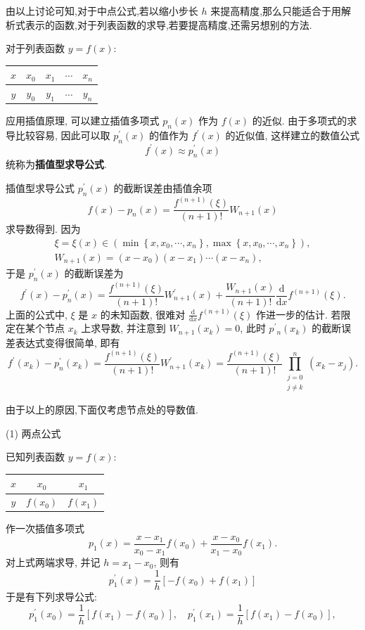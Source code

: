 由以上讨论可知,对于中点公式,若以缩小步长 $h$ 来提高精度,那么只能适合于用解析式表示的函数,对于列表函数的求导,若要提高精度,还需另想别的方法.

对于列表函数 $y=f(x)$:
\begin{center}
\begin{tabular}{c|cccc}
$ x $ & $ x_{0} $ & $ x_{1} $ & $ \cdots $ & $ x_{n} $ \\
\hline$ y $ & $ y_{0} $ & $ y_{1} $ & $ \cdots $ & $ y_{n} $
\end{tabular}
\end{center}
应用插值原理, 可以建立插值多项式 $ p_{n}(x) $ 作为 $ f(x) $ 的近似. 由于多项式的求导比较容易, 因此可以取 $ p_{n}^{\prime}(x) $ 的值作为 $ f^{\prime}(x) $ 的近似值, 这样建立的数值公式
$$
f^{\prime}(x) \approx p_{n}^{\prime}(x)
$$
统称为\textbf{插值型求导公式}.

插值型求导公式 $ p_{n}^{\prime}(x) $ 的截断误差由插值余项
$$
f(x)-p_{n}(x)=\frac{f^{(n+1)}(\xi)}{(n+1)!} W_{n+1}(x)
$$
求导数得到. 因为
$$
\begin{array}{c}
\xi=\xi(x) \in\left(\min \left\{x, x_{0}, \cdots, x_{n}\right\}, \max \left\{x, x_{0}, \cdots, x_{n}\right\}\right), \\
W_{n+1}(x)=\left(x-x_{0}\right)\left(x-x_{1}\right) \cdots\left(x-x_{n}\right),
\end{array}
$$
于是 $ p_{n}^{\prime}(x) $ 的截断误差为
$$
f^{\prime}(x)-p_{n}^{\prime}(x)=\frac{f^{(n+1)}(\xi)}{(n+1)!} W_{n+1}^{\prime}(x)+\frac{W_{n+1}(x)}{(n+1)!} \frac{\mathrm{d}}{\mathrm{d} x} f^{(n+1)}(\xi) .
$$
上面的公式中, $ \xi $ 是 $ x $ 的未知函数, 很难对 $ \frac{\mathrm{d}}{\mathrm{d} x} f^{(n+1)}(\xi) $ 作进一步的估计. 若限定在某个节点 $ x_{k} $ 上求导数, 并注意到 $ W_{n+1}\left(x_{k}\right)=0 $, 此时 $ p^{\prime}{ }_{n}\left(x_{k}\right) $ 的截断误差表达式变得很简单, 即有
$$
f^{\prime}\left(x_{k}\right)-p_{n}^{\prime}\left(x_{k}\right)=\frac{f^{(n+1)}(\xi)}{(n+1)!} W_{n+1}^{\prime}\left(x_{k}\right)=\frac{f^{(n+1)}(\xi)}{(n+1)!} \prod_{\substack{j=0 \\ j \neq k}}^{n}\left(x_{k}-x_{j}\right) .
$$

由于以上的原因,下面仅考虑节点处的导数值.

(1) 两点公式

已知列表函数 $ y=f(x): $
\begin{tabular}{c|cc}
$ x $ & $ x_{0} $ & $ x_{1} $ \\
\hline$ y $ & $ f\left(x_{0}\right) $ & $ f\left(x_{1}\right) $
\end{tabular}
作一次插值多项式
$$
p_{1}(x)=\frac{x-x_{1}}{x_{0}-x_{1}} f\left(x_{0}\right)+\frac{x-x_{0}}{x_{1}-x_{0}} f\left(x_{1}\right) .
$$
对上式两端求导, 并记 $ h=x_{1}-x_{0} $, 则有
$$
p_{1}^{\prime}(x)=\frac{1}{h}\left[-f\left(x_{0}\right)+f\left(x_{1}\right)\right]
$$
于是有下列求导公式:
$$
p_{1}^{\prime}\left(x_{0}\right)=\frac{1}{h}\left[f\left(x_{1}\right)-f\left(x_{0}\right)\right], \quad p_{1}^{\prime}\left(x_{1}\right)=\frac{1}{h}\left[f\left(x_{1}\right)-f\left(x_{0}\right)\right],
$$

